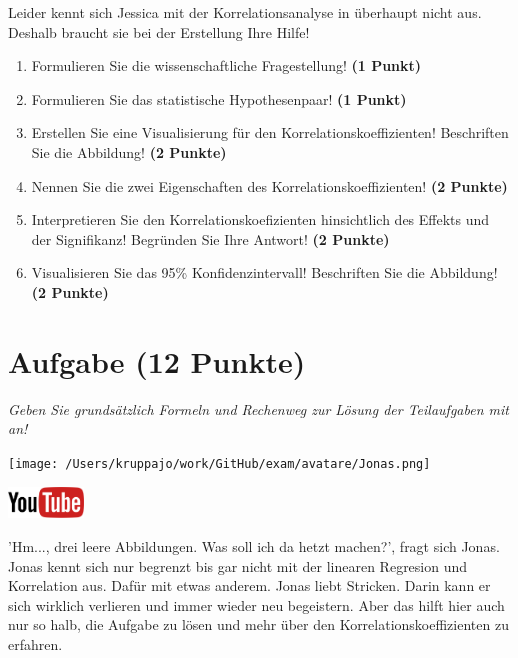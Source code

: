 \documentclass[a4paper, 9pt]{scrartcl}\usepackage[]{graphicx}\usepackage[]{xcolor}
\begin{document}
Leider kennt sich Jessica mit der Korrelationsanalyse in \Rlogo überhaupt nicht aus. Deshalb braucht sie bei der Erstellung Ihre Hilfe!

\begin{enumerate}
  \item Formulieren Sie die wissenschaftliche Fragestellung! \textbf{(1 Punkt)}
  \item Formulieren Sie das statistische Hypothesenpaar! \textbf{(1 Punkt)}
\item Erstellen Sie eine Visualisierung für den Korrelationskoeffizienten! Beschriften Sie die Abbildung! \textbf{(2 Punkte)}
\item Nennen Sie die zwei Eigenschaften des Korrelationskoeffizienten! \textbf{(2 Punkte)}
\item Interpretieren Sie den Korrelationskoefizienten hinsichtlich des
  Effekts und der Signifikanz! Begründen Sie Ihre Antwort! \textbf{(2 Punkte)}
\item Visualisieren Sie das 95\% Konfidenzintervall! Beschriften Sie die Abbildung! \textbf{(2 Punkte)} 
\end{enumerate} 
\clearpage

\section{Aufgabe \hfill (12 Punkte)}

\textit{Geben Sie grundsätzlich Formeln und Rechenweg zur Lösung der Teilaufgaben mit an!} \\[1Ex]
 

 
\begin{minipage}[t]{0.5\textwidth}
\texttt{[image: /Users/kruppajo/work/GitHub/exam/avatare/Jonas.png]}
\end{minipage}
\begin{minipage}[t]{0.5\textwidth}
\hfill
\href{https://youtu.be/fB6nF4dxodA}{\includegraphics[width = 2cm]{img/youtube}}
\end{minipage}
\vspace{1ex}



'Hm..., drei leere Abbildungen. Was soll ich da hetzt machen?', fragt sich Jonas. Jonas kennt sich nur begrenzt bis gar nicht mit der linearen Regresion und Korrelation aus. Dafür mit etwas anderem. Jonas liebt Stricken. Darin kann er sich wirklich verlieren und immer wieder neu begeistern. Aber das hilft hier auch nur so halb, die Aufgabe zu lösen und mehr über den Korrelationskoeffizienten zu erfahren.
\vspace{2Ex}
\end{document}

